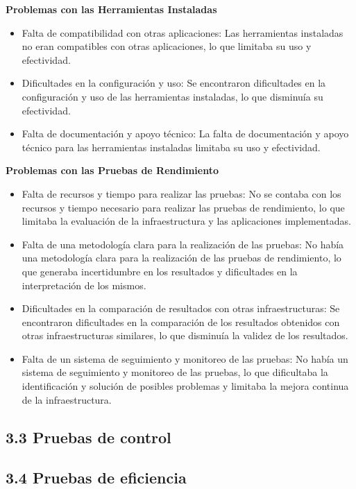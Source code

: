 \begin{doublespace}
    \textbf{Problemas con las Herramientas Instaladas}

    \begin{itemize}
        \item Falta de compatibilidad con otras aplicaciones: Las herramientas instaladas no eran compatibles con otras aplicaciones, lo que limitaba su uso y efectividad.
        \item Dificultades en la configuración y uso: Se encontraron dificultades en la configuración y uso de las herramientas instaladas, lo que disminuía su efectividad.
        \item Falta de documentación y apoyo técnico: La falta de documentación y apoyo técnico para las herramientas instaladas limitaba su uso y efectividad.
    \end{itemize}

    \textbf{Problemas con las Pruebas de Rendimiento}

    \begin{itemize}
        \item Falta de recursos y tiempo para realizar las pruebas: No se contaba con los recursos y tiempo necesario para realizar las pruebas de rendimiento, lo que limitaba la evaluación de la infraestructura y las aplicaciones implementadas.
        \item Falta de una metodología clara para la realización de las pruebas: No había una metodología clara para la realización de las pruebas de rendimiento, lo que generaba incertidumbre en los resultados y dificultades en la interpretación de los mismos.
        \item Dificultades en la comparación de resultados con otras infraestructuras: Se encontraron dificultades en la comparación de los resultados obtenidos con otras infraestructuras similares, lo que disminuía la validez de los resultados.
        \item Falta de un sistema de seguimiento y monitoreo de las pruebas: No había un sistema de seguimiento y monitoreo de las pruebas, lo que dificultaba la identificación y solución de posibles problemas y limitaba la mejora continua de la infraestructura.
    \end{itemize}

    \subsection{3.3 Pruebas de control}

    \subsection{3.4 Pruebas de eficiencia}


\end{doublespace}
